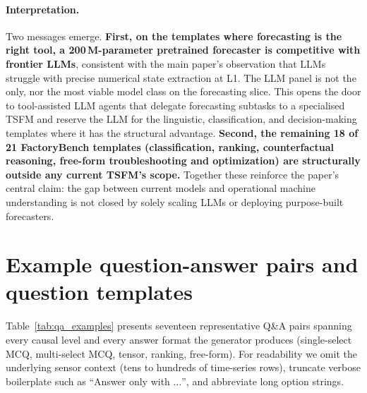 \documentclass{article}
\begin{document}
\paragraph{Interpretation.} Two messages emerge. \textbf{First, on the templates where forecasting is the right tool, a 200\,M-parameter pretrained forecaster is competitive with frontier LLMs}, consistent with the main paper's observation that LLMs struggle with precise numerical state extraction at L1. The LLM panel is not the only, nor the most viable model class on the forecasting slice. This opens the door to tool-assisted LLM agents that delegate forecasting subtasks to a specialised TSFM and reserve the LLM for the linguistic, classification, and decision-making templates where it has the structural advantage. \textbf{Second, the remaining 18 of 21 FactoryBench templates (classification, ranking, counterfactual reasoning, free-form troubleshooting and optimization) are structurally outside any current TSFM's scope.} Together these reinforce the paper's central claim: the gap between current models and operational machine understanding is not closed by solely scaling LLMs or deploying purpose-built forecasters.


\section{Example question-answer pairs and question templates}
\label{app:qa_examples}

Table~\ref{tab:qa_examples} presents seventeen representative Q\&A pairs spanning every causal level and every answer format the generator produces (single-select MCQ, multi-select MCQ, tensor, ranking, free-form). For readability we omit the underlying sensor context (tens to hundreds of time-series rows), truncate verbose boilerplate such as ``Answer only with $\ldots$'', and abbreviate long option strings.
\end{document}
